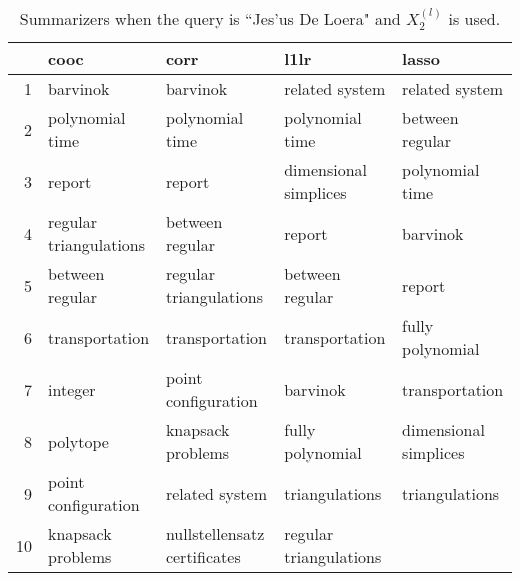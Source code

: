 \documentclass{article}
\begin{document}
\begin{table}[H]
\begin{center}
\begin{tabular}{|r|llll|}
\hline
& cooc & corr & l1lr & lasso \\
\hline
1 & barvinok & barvinok & related system & related system \\
2 & polynomial time & polynomial time & polynomial time & between regular \\
3 & report & report & dimensional simplices & polynomial time \\
4 & regular triangulations & between regular & report & barvinok \\
5 & between regular & regular triangulations & between regular & report \\
6 & transportation & transportation & transportation & fully polynomial \\
7 & integer & point configuration & barvinok & transportation \\
8 & polytope & knapsack problems & fully polynomial & dimensional simplices \\
9 & point configuration & related system & triangulations & triangulations \\
10 & knapsack problems & nullstellensatz certificates & regular triangulations & \\
\hline
\end{tabular}
\end{center}
\caption{Summarizers when the query is ``Jes\a'us De Loera" and $X_2^{(l)}$ is used.}
\end{table}
\end{document}
